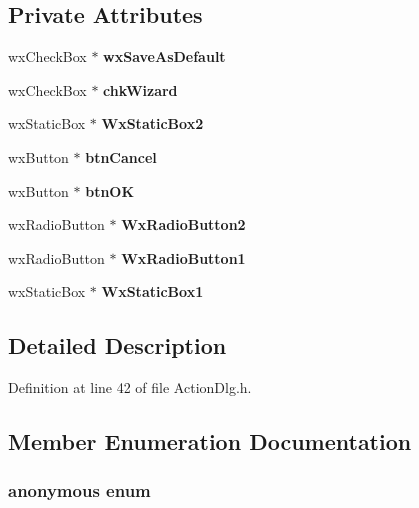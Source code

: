\subsection*{Private Attributes}
\begin{CompactItemize}
\item 
wx\-Check\-Box $\ast$ {\bf wx\-Save\-As\-Default}
\item 
wx\-Check\-Box $\ast$ {\bf chk\-Wizard}
\item 
wx\-Static\-Box $\ast$ {\bf Wx\-Static\-Box2}
\item 
wx\-Button $\ast$ {\bf btn\-Cancel}
\item 
wx\-Button $\ast$ {\bf btn\-OK}
\item 
wx\-Radio\-Button $\ast$ {\bf Wx\-Radio\-Button2}
\item 
wx\-Radio\-Button $\ast$ {\bf Wx\-Radio\-Button1}
\item 
wx\-Static\-Box $\ast$ {\bf Wx\-Static\-Box1}
\end{CompactItemize}


\subsection{Detailed Description}




Definition at line 42 of file Action\-Dlg.h.

\subsection{Member Enumeration Documentation}
\subsubsection{\setlength{\rightskip}{0pt plus 5cm}anonymous enum\hspace{0.3cm}{\tt  [private]}}\label{class_action_dlg_696de2e3be443a31c9b8ad99514d95b7}


